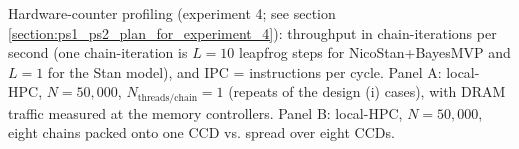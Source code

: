 \begin{table}[H]
{{%
        Hardware-counter profiling (experiment 4; see section \ref{section:ps1_ps2_plan_for_experiment_4}):
        throughput in chain-iterations per second
        (one chain-iteration is $L = 10$ leapfrog steps for NicoStan+BayesMVP
        and $L = 1$ for the Stan model), and IPC = instructions per cycle.
        Panel A: local-HPC, $N{=}50,000$, $N_{\text{threads/chain}} = 1$ (repeats of the design (i) cases),
        with DRAM traffic measured at the memory controllers.
        Panel B: local-HPC, $N{=}50,000$, eight chains packed onto one CCD vs. spread over eight CCDs.
}}
\end{table}
